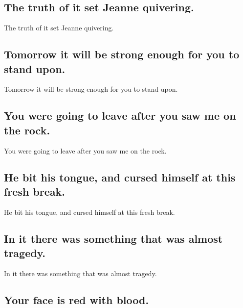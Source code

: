 \documentclass[]{article}
\begin{document}
\hypertarget{the-truth-of-it-set-jeanne-quivering.}{%
\subsection{The truth of it set Jeanne
quivering.}\label{the-truth-of-it-set-jeanne-quivering.}}

The truth of it set Jeanne quivering.

\hypertarget{tomorrow-it-will-be-strong-enough-for-you-to-stand-upon.}{%
\subsection{Tomorrow it will be strong enough for you to stand
upon.}\label{tomorrow-it-will-be-strong-enough-for-you-to-stand-upon.}}

Tomorrow it will be strong enough for you to stand upon.

\hypertarget{you-were-going-to-leave-after-you-saw-me-on-the-rock.}{%
\subsection{You were going to leave after you saw me on the
rock.}\label{you-were-going-to-leave-after-you-saw-me-on-the-rock.}}

You were going to leave after you saw me on the rock.

\hypertarget{he-bit-his-tongue-and-cursed-himself-at-this-fresh-break.}{%
\subsection{He bit his tongue, and cursed himself at this fresh
break.}\label{he-bit-his-tongue-and-cursed-himself-at-this-fresh-break.}}

He bit his tongue, and cursed himself at this fresh break.

\hypertarget{in-it-there-was-something-that-was-almost-tragedy.}{%
\subsection{In it there was something that was almost
tragedy.}\label{in-it-there-was-something-that-was-almost-tragedy.}}

In it there was something that was almost tragedy.

\hypertarget{your-face-is-red-with-blood.}{%
\subsection{Your face is red with
blood.}\label{your-face-is-red-with-blood.}}
\end{document}

